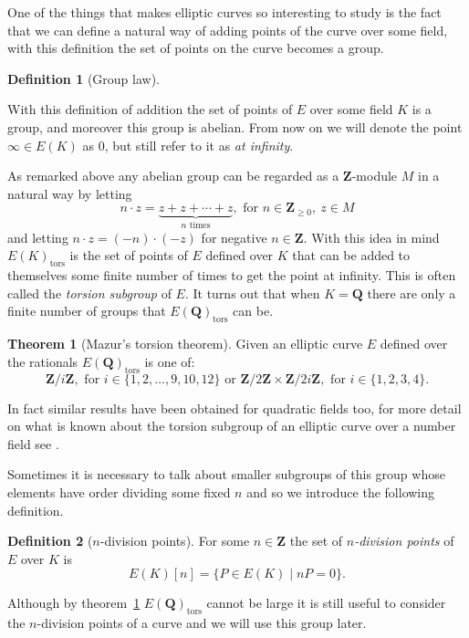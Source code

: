\documentclass[a4paper,abstracton,bibtotoc]{scrreprt}
\theoremstyle{definition}
\newtheorem{thm}{Theorem}
\newtheorem{defn}{Definition}
\newcommand{\QQ}{\mathbf{Q}}
\newcommand{\ZZ}{\mathbf{Z}}
\begin{document}
One of the things that makes elliptic curves so interesting to study is the fact that we can define a natural way of adding points of the curve over some field, with this definition the set of points on the curve becomes a group.

\begin{defn}[Group law]
\end{defn}

With this definition of addition the set of points of $E$ over some field $K$ is a group, and moreover this group is abelian.
From now on we will denote the point $\infty\in E(K)$ as $0$, but still refer to it as \emph{at infinity}.

As remarked above any abelian group can be regarded as a $\ZZ$-module $M$ in a natural way by letting 
\[n\cdot z = \underbrace{z + z + \cdots + z}_\text{$n$ times},\text{ for } n\in\ZZ_{\ge 0},\ z\in M\]
and letting $n\cdot z = (-n)\cdot(-z)$ for negative $n\in \ZZ$.
With this idea in mind $E(K)_\text{tors}$ is the set of points of $E$ defined over $K$ that can be added to themselves some finite number of times to get the point at infinity.
This is often called the \emph{torsion subgroup} of $E$.
It turns out that when $K = \QQ$ there are only a finite number of groups that $E(\QQ)_\text{tors}$ can be.

\begin{thm}[Mazur's torsion theorem]
\label{thm:tors}
Given an elliptic curve $E$ defined over the rationals $E(\QQ)_\text{tors}$ is one of:
\[
\ZZ/i\ZZ,\text{ for } i \in\{1,2,\ldots,9,10,12\}\text{ or }
\ZZ/2\ZZ \times \ZZ/2i\ZZ,\text{ for } i \in\{1,2,3,4\}.
\]
\end{thm}

In fact similar results have been obtained for quadratic fields too, for more detail on what is known about the torsion subgroup of an elliptic curve over a number field see \cite{sutherland}.

Sometimes it is necessary to talk about smaller subgroups of this group whose elements have order dividing some fixed $n$ and so we introduce the following definition.
\begin{defn}[$n$-division points]
For some $n\in\ZZ$ the set of \emph{$n$-division points} of $E$ over $K$ is
\[
E(K)[n] = \{P\in E(K) \mid nP = 0\}.
\]
\end{defn}
Although by theorem~\ref{thm:tors} $E(\QQ)_\text{tors}$ cannot be large it is still useful to consider the $n$-division points of a curve and we will use this group later.
\end{document}
